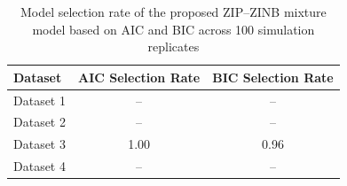 \begin{table}[!h]
\caption{Model selection rate of the proposed ZIP--ZINB mixture model based on AIC and BIC across 100 simulation replicates}
\centering
\begin{tabular}{lcc}
\toprule
Dataset & AIC Selection Rate & BIC Selection Rate \\
\midrule
Dataset 1 & -- & -- \\
Dataset 2 & -- & -- \\
Dataset 3 & 1.00 & 0.96 \\
Dataset 4 & -- & -- \\
\bottomrule
\end{tabular}
\label{tab:sim_selection}
\end{table}
